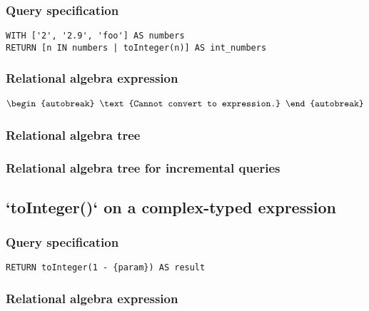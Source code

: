 \subsubsection*{Query specification}

\begin{lstlisting}
WITH ['2', '2.9', 'foo'] AS numbers
RETURN [n IN numbers | toInteger(n)] AS int_numbers
\end{lstlisting}

\subsubsection*{Relational algebra expression}

\begin{align*}
\begin{autobreak}
\text{Cannot convert to expression.}
\end{autobreak}
\end{align*}

\subsubsection*{Relational algebra tree}


\subsubsection*{Relational algebra tree for incremental queries}


\subsection{`toInteger()` on a complex-typed expression}

\subsubsection*{Query specification}

\begin{lstlisting}
RETURN toInteger(1 - {param}) AS result
\end{lstlisting}

\subsubsection*{Relational algebra expression}

